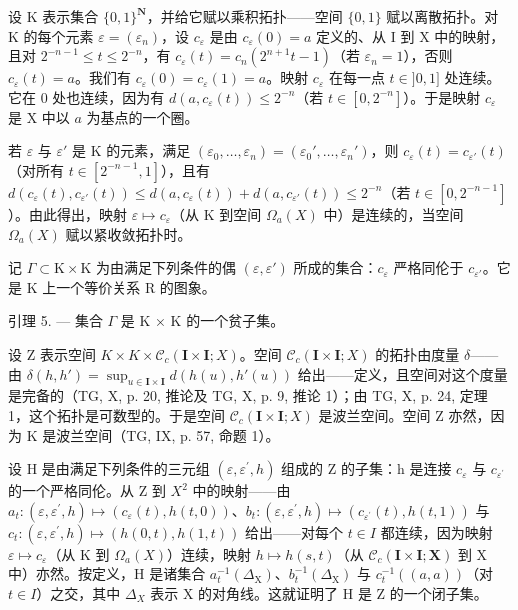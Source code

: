 设 K 表示集合 \(\{0,1\}^{\mathbf{N}}\)，并给它赋以乘积拓扑——空间 \(\{0,1\}\) 赋以离散拓扑。对 K 的每个元素 \(\varepsilon = (\varepsilon_n)\)，设 \(c_{\varepsilon}\) 是由 \(c_{\varepsilon}(0) = a\) 定义的、从 I 到 X 中的映射，且对 \(2^{-n - 1} \leqslant t \leqslant 2^{-n}\)，有 \(c_{\varepsilon}(t) = c_n(2^{n + 1}t - 1)\)（若 \(\varepsilon_n = 1\)），否则 \(c_{\varepsilon}(t) = a\)。我们有 \(c_{\varepsilon}(0) = c_{\varepsilon}(1) = a\)。映射 \(c_{\varepsilon}\) 在每一点 \(t \in ]0,1]\) 处连续。它在 0 处也连续，因为有 \(d(a,c_{\varepsilon}(t)) \leqslant 2^{-n}\)（若 \(t \in [0,2^{-n}] \)）。于是映射 \(c_{\varepsilon}\) 是 X 中以 \(a\) 为基点的一个圈。

若 \(\varepsilon\) 与 \(\varepsilon'\) 是 K 的元素，满足 \((\varepsilon_0, \ldots, \varepsilon_n) = (\varepsilon_0', \ldots, \varepsilon_n')\)，则 \(c_{\varepsilon}(t) = c_{\varepsilon'}(t)\)（对所有 \(t \in [2^{-n-1}, 1]\)），且有 \(d(c_{\varepsilon}(t), c_{\varepsilon'}(t)) \leqslant d(a, c_{\varepsilon}(t)) + d(a, c_{\varepsilon'}(t)) \leqslant 2^{-n}\)（若 \(t \in [0, 2^{-n-1}]\)）。由此得出，映射 \(\varepsilon \mapsto c_{\varepsilon}\)（从 K 到空间 \(\Omega_a(X)\) 中）是连续的，当空间 \(\Omega_a(X)\) 赋以紧收敛拓扑时。

记 \(\Gamma \subset \mathrm{K} \times \mathrm{K}\) 为由满足下列条件的偶 \((\varepsilon, \varepsilon')\) 所成的集合：\(c_{\varepsilon}\) 严格同伦于 \(c_{\varepsilon'}\)。它是 K 上一个等价关系 R 的图象。

引理 5. --- 集合 \(\Gamma\) 是 K × K 的一个贫子集。

设 Z 表示空间 \(K \times K \times \mathcal{C}_{c}(\mathbf{I} \times \mathbf{I}; X)\)。空间 \(\mathcal{C}_{c}(\mathbf{I} \times \mathbf{I}; X)\) 的拓扑由度量 \(\delta\)——由 \(\delta(h, h') = \sup_{u \in \mathbf{I} \times \mathbf{I}} d(h(u), h'(u))\) 给出——定义，且空间对这个度量是完备的（TG, X, p. 20, 推论及 TG, X, p. 9, 推论 1）；由 TG, X, p. 24, 定理 1，这个拓扑是可数型的。于是空间 \(\mathcal{C}_{c}(\mathbf{I} \times \mathbf{I}; X)\) 是波兰空间。空间 Z 亦然，因为 K 是波兰空间（TG, IX, p. 57, 命题 1）。

设 H 是由满足下列条件的三元组 \((\varepsilon,\varepsilon^{\prime},h)\) 组成的 Z 的子集：h 是连接 \(c_{\varepsilon}\) 与 \(c_{\varepsilon^{\prime}}\) 的一个严格同伦。从 Z 到 \(X^{2}\) 中的映射——由 \(a_{t}\colon(\varepsilon,\varepsilon^{\prime},h)\mapsto(c_{\varepsilon}(t),h(t,0))\)、\(b_{t}\colon(\varepsilon,\varepsilon^{\prime},h)\mapsto(c_{\varepsilon^{\prime}}(t),h(t,1))\) 与 \(c_{t}\colon(\varepsilon,\varepsilon^{\prime},h)\mapsto(h(0,t),h(1,t))\) 给出——对每个 \(t\in I\) 都连续，因为映射 \(\varepsilon\mapsto c_{\varepsilon}\)（从 K 到 \(\Omega_{a}(X)\)）连续，映射 \(h\mapsto h(s,t)\)（从 \(\mathcal{C}_{c}(\mathbf{I}\times\mathbf{I};\mathbf{X})\) 到 X 中）亦然。按定义，H 是诸集合 \(a_{t}^{-1}(\Delta_{\mathrm{X}})\)、\(b_{t}^{-1}(\Delta_{\mathrm{X}})\) 与 \(c_{t}^{-1}((a,a))\)（对 \(t\in I\)）之交，其中 \(\Delta_{X}\) 表示 X 的对角线。这就证明了 H 是 Z 的一个闭子集。

